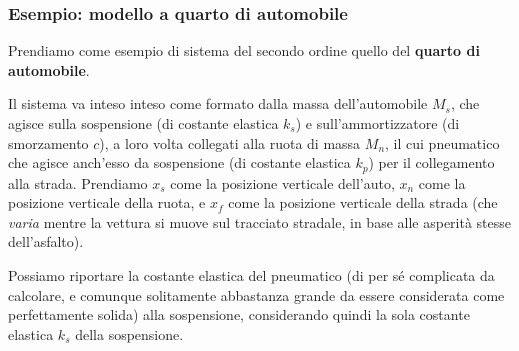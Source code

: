 \documentclass[a4paper,11pt]{article}
\begin{document}
\subsubsection{Esempio: modello a quarto di automobile}
Prendiamo come esempio di sistema del secondo ordine quello del \textbf{quarto di automobile}.

Il sistema va inteso inteso come formato dalla massa dell'automobile $M_s$, che agisce sulla sospensione (di costante elastica $k_s$) e sull'ammortizzatore (di smorzamento $c$), a loro volta collegati alla ruota di massa $M_n$, il cui pneumatico che agisce anch'esso da sospensione (di costante elastica $k_p$) per il collegamento alla strada.
Prendiamo $x_s$ come la posizione verticale dell'auto, $x_n$ come la posizione verticale della ruota, e $x_f$ come la posizione verticale della strada (che \textit{varia} mentre la vettura si muove sul tracciato stradale, in base alle asperità stesse dell'asfalto).

Possiamo riportare la costante elastica del pneumatico (di per sé complicata da calcolare, e comunque solitamente abbastanza grande da essere considerata come perfettamente solida) alla sospensione, considerando quindi la sola costante elastica $k_s$ della sospensione.
\end{document}

